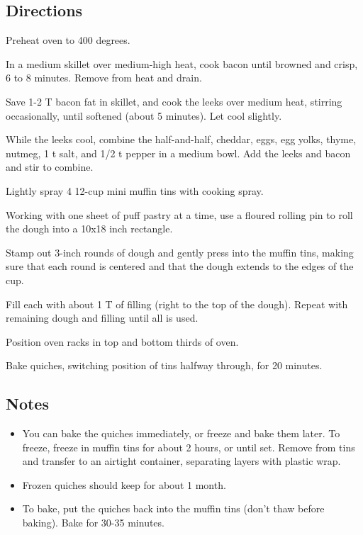 \documentclass{article}
\newcounter{qcounter}
\begin{document}
\subsection*{Directions}
\begin{list}{:~}{}
\item Preheat oven to 400 degrees.
\item In a medium skillet over medium-high heat, cook bacon until browned and crisp, 6 to 8 minutes. Remove from heat and drain. 
\item Save 1-2 T bacon fat in skillet, and cook the leeks over medium heat, stirring occasionally, until softened (about 5 minutes). Let cool slightly.
\item While the leeks cool, combine the half-and-half, cheddar, eggs, egg yolks, thyme, nutmeg, 1 t salt, and 1/2 t pepper in a  medium bowl. Add the leeks and bacon and stir to combine. 
\item Lightly spray 4 12-cup mini muffin tins with cooking spray.  
\item Working with one sheet of puff pastry at a time, use a floured rolling pin to roll the dough into a 10x18 inch rectangle. 
\item Stamp out 3-inch rounds of dough and gently press into the muffin tins, making sure that each round is centered and that the dough extends to the edges of the cup.  
\item Fill each with about 1 T of filling (right to the top of the dough). Repeat with remaining dough and filling until all is used.
\item Position oven racks in top and bottom thirds of oven.
\item Bake quiches, switching position of tins halfway through, for 20 minutes.
\end{list}

\subsection*{Notes}
\begin{itemize}
\item You can bake the quiches immediately, or freeze and bake them later.  To freeze, freeze in muffin tins for about 2 hours, or until set. Remove from tins and transfer to an airtight container, separating layers with plastic wrap.  
\item Frozen quiches should keep for about 1 month.  
\item To bake, put the quiches back into the muffin tins (don't thaw before baking). Bake for 30-35 minutes.
\end{itemize}
\end{document}
